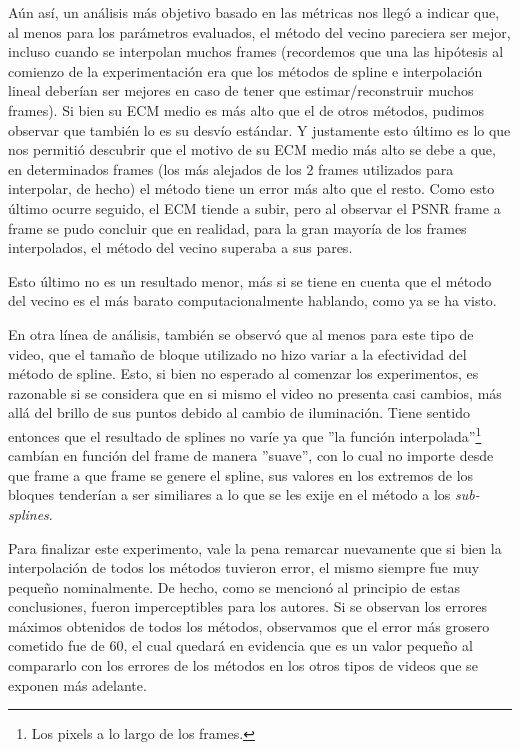 \par A\'un as\'i, un an\'alisis m\'as objetivo basado en las m\'etricas nos
lleg\'o a indicar que, al menos para los par\'ametros evaluados, el m\'etodo
del vecino pareciera ser mejor, incluso cuando se interpolan muchos frames
(recordemos que una las hip\'otesis al comienzo de la experimentaci\'on era que
los m\'etodos de spline e interpolaci\'on lineal deber\'ian ser mejores en caso
de tener que estimar/reconstruir muchos frames). Si bien su ECM medio es m\'as
alto que el de otros m\'etodos, pudimos observar que tambi\'en lo es su
desv\'io est\'andar. Y justamente esto \'ultimo es lo que nos permiti\'o
descubrir que el motivo de su ECM medio m\'as alto se debe a que, en
determinados frames (los m\'as alejados de los 2 frames utilizados para
interpolar, de hecho) el m\'etodo tiene un error m\'as alto que el resto. Como
esto \'ultimo ocurre seguido, el ECM tiende a subir, pero al observar el PSNR
frame a frame se pudo concluir que en realidad, para la gran mayor\'ia de los
frames interpolados, el m\'etodo del vecino superaba a sus pares.

\par Esto \'ultimo no es un resultado menor, m\'as si se tiene en cuenta que
el m\'etodo del vecino es el m\'as barato computacionalmente hablando, como ya
se ha visto.

\par En otra l\'inea de an\'alisis, tambi\'en se observ\'o que al menos para
este tipo de video, que el tama\~no de bloque utilizado no hizo variar a la
efectividad del m\'etodo de spline. Esto, si bien no esperado al comenzar los
experimentos, es razonable si se considera que en si mismo el video no presenta
casi cambios, m\'as all\'a del brillo de sus puntos debido al cambio de
iluminaci\'on. Tiene sentido entonces que el resultado de splines no var\'ie ya
que ''la funci\'on interpolada''\footnote{Los pixels a lo largo de los frames.}
camb\'ian en funci\'on del frame de manera ''suave'', con lo cual no importe
desde que frame a que frame se genere el spline, sus valores en los extremos de
los bloques tender\'ian a ser similiares a lo que se les exije en el m\'etodo a
los \emph{sub-splines}.

\par Para finalizar este experimento, vale la pena remarcar nuevamente que si
bien la interpolaci\'on de todos los m\'etodos tuvieron error, el mismo siempre
fue muy peque\~no nominalmente. De hecho, como se mencion\'o al principio de
estas conclusiones, fueron imperceptibles para los autores. Si se observan los
errores m\'aximos obtenidos de todos los m\'etodos, observamos que el error
m\'as grosero cometido fue de 60, el cual quedar\'a en evidencia que es un
valor peque\~no al compararlo con los errores de los m\'etodos en los otros
tipos de videos que se exponen m\'as adelante.

